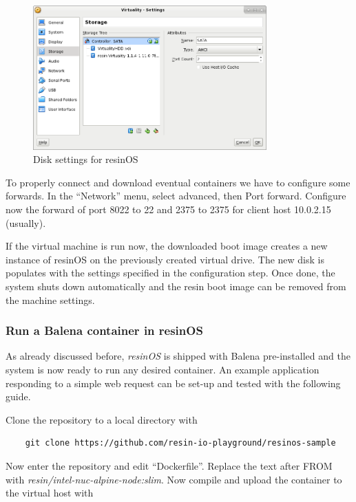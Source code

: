 \documentclass[]{scrartcl}
\begin{document}
\begin{figure}[t]
	\centering
	\includegraphics[width=0.8\textwidth]{resin-vbox2}
	\caption{Disk settings for resinOS}
	\label{fig:resindisk}
\end{figure}

To properly connect and download eventual containers we have to configure some forwards. In the ``Network'' menu, select advanced, then Port forward. Configure now the forward of port 8022 to 22  and 2375 to 2375 for client host 10.0.2.15 (usually).

If the virtual machine is run now, the downloaded boot image creates a new instance of resinOS on the previously created virtual drive. The new disk is populates with the settings specified in the configuration step. Once done, the system shuts down automatically and the resin boot image can be removed from the machine settings.

\subsubsection{Run a Balena container in resinOS}

As already discussed before, \textit{resinOS} is shipped with Balena pre-installed and the system is now ready to run any desired container. 
An example application responding to a simple web request can be set-up and tested with the following guide.

Clone the repository to a local directory with
\begin{verbatim}
	git clone https://github.com/resin-io-playground/resinos-sample
\end{verbatim}

Now enter the repository and edit ``Dockerfile''. Replace the text after FROM with \textit{resin/intel-nuc-alpine-node:slim}. Now compile and upload the container to the virtual host with
\end{document}
